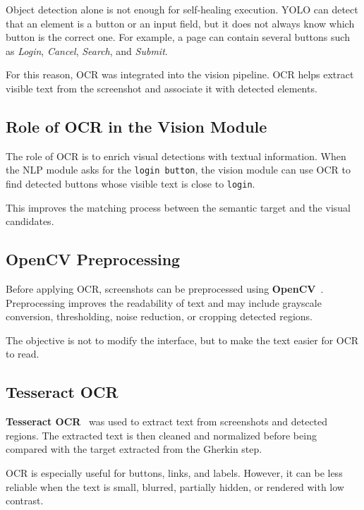 Object detection alone is not enough for self-healing execution. YOLO can detect that an element is a button or an input field, but it does not always know which button is the correct one. For example, a page can contain several buttons such as \textit{Login}, \textit{Cancel}, \textit{Search}, and \textit{Submit}.

For this reason, OCR was integrated into the vision pipeline. OCR helps extract visible text from the screenshot and associate it with detected elements.

\subsection{Role of OCR in the Vision Module}
\label{subsec:ocr_role}

The role of OCR is to enrich visual detections with textual information. When the NLP module asks for the \texttt{login button}, the vision module can use OCR to find detected buttons whose visible text is close to \texttt{login}.

This improves the matching process between the semantic target and the visual candidates.

\subsection{OpenCV Preprocessing}
\label{subsec:opencv_preprocessing}

Before applying OCR, screenshots can be preprocessed using \textbf{OpenCV}~\cite{opencv_library}. Preprocessing improves the readability of text and may include grayscale conversion, thresholding, noise reduction, or cropping detected regions.

The objective is not to modify the interface, but to make the text easier for OCR to read.

\subsection{Tesseract OCR}
\label{subsec:tesseract_ocr}

\textbf{Tesseract OCR}~\cite{tesseract_paper,tesseract_docs} was used to extract text from screenshots and detected regions. The extracted text is then cleaned and normalized before being compared with the target extracted from the Gherkin step.

OCR is especially useful for buttons, links, and labels. However, it can be less reliable when the text is small, blurred, partially hidden, or rendered with low contrast.

